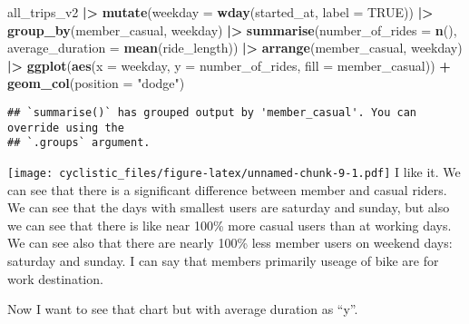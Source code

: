 \documentclass[
]{article}
\newenvironment{Shaded}{\begin{snugshade}}{\end{snugshade}}
\newcommand{\AttributeTok}[1]{\textcolor[rgb]{0.13,0.29,0.53}{#1}}
\newcommand{\ConstantTok}[1]{\textcolor[rgb]{0.56,0.35,0.01}{#1}}
\newcommand{\FunctionTok}[1]{\textcolor[rgb]{0.13,0.29,0.53}{\textbf{#1}}}
\newcommand{\NormalTok}[1]{#1}
\newcommand{\SpecialCharTok}[1]{\textcolor[rgb]{0.81,0.36,0.00}{\textbf{#1}}}
\newcommand{\StringTok}[1]{\textcolor[rgb]{0.31,0.60,0.02}{#1}}
\begin{document}
\begin{Shaded}
\begin{Highlighting}[]
\NormalTok{all\_trips\_v2 }\SpecialCharTok{|\textgreater{}} 
  \FunctionTok{mutate}\NormalTok{(}\AttributeTok{weekday =} \FunctionTok{wday}\NormalTok{(started\_at, }\AttributeTok{label =} \ConstantTok{TRUE}\NormalTok{)) }\SpecialCharTok{|\textgreater{}}
  \FunctionTok{group\_by}\NormalTok{(member\_casual, weekday) }\SpecialCharTok{|\textgreater{}} 
  \FunctionTok{summarise}\NormalTok{(}\AttributeTok{number\_of\_rides =} \FunctionTok{n}\NormalTok{(), }\AttributeTok{average\_duration =} \FunctionTok{mean}\NormalTok{(ride\_length)) }\SpecialCharTok{|\textgreater{}} 
  \FunctionTok{arrange}\NormalTok{(member\_casual, weekday) }\SpecialCharTok{|\textgreater{}} 
  \FunctionTok{ggplot}\NormalTok{(}\FunctionTok{aes}\NormalTok{(}\AttributeTok{x =}\NormalTok{ weekday, }\AttributeTok{y =}\NormalTok{ number\_of\_rides, }\AttributeTok{fill =}\NormalTok{ member\_casual)) }\SpecialCharTok{+}
  \FunctionTok{geom\_col}\NormalTok{(}\AttributeTok{position =} \StringTok{"dodge"}\NormalTok{)}
\end{Highlighting}
\end{Shaded}

\begin{verbatim}
## `summarise()` has grouped output by 'member_casual'. You can override using the
## `.groups` argument.
\end{verbatim}

\texttt{[image: cyclistic\_files/figure-latex/unnamed-chunk-9-1.pdf]} I
like it. We can see that there is a significant difference between
member and casual riders. We can see that the days with smallest users
are saturday and sunday, but also we can see that there is like near
100\% more casual users than at working days. We can see also that there
are nearly 100\% less member users on weekend days: saturday and sunday.
I can say that members primarily useage of bike are for work
destination.

Now I want to see that chart but with average duration as ``y''.
\end{document}
